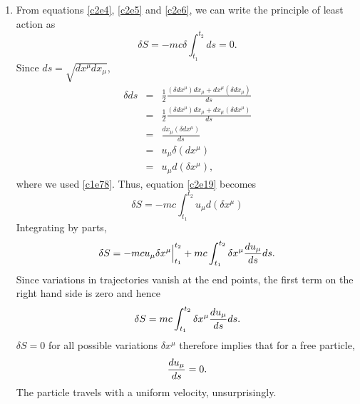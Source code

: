 \begin{enumerate}
\item From equations \eqref{c2e4}, \eqref{c2e5} and \eqref{c2e6}, we can write
the principle of least action as
\begin{equation}\label{c2e19}
\delta S = -mc\delta\int_{t_1}^{t_2} ds = 0.
\end{equation}
Since $ds = \sqrt{dx^\mu dx_\mu}$, 
\begin{eqnarray*}
\delta ds 
 &=& \frac{1}{2}\frac{(\delta dx^\mu)dx_\mu + dx^\mu (\delta dx_\mu)}{ds} \\
 &=& \frac{1}{2}\frac{(\delta dx^\mu)dx_\mu + dx_\mu (\delta dx^\mu)}{ds} \\
 &=& \frac{dx_\mu(\delta dx^\mu)}{ds} \\
 &=& u_\mu \delta(dx^\mu) \\
 &=& u_\mu d(\delta x^\mu),
\end{eqnarray*}
where we used \eqref{c1e78}. Thus, equation \eqref{c2e19} becomes
\begin{equation}\label{c2e20}
\delta S = -mc\int_{t_1}^{t_2}u_\mu d(\delta x^\mu)
\end{equation}
Integrating by parts,
\begin{equation}\label{c2e21}
\delta S = -mc u_\mu \delta x^\mu\Big|_{t_1}^{t_2} + 
mc\int_{t_1}^{t_2}\delta x^\mu \frac{d{u_\mu}}{d{s}}ds.
\end{equation}
Since variations in trajectories vanish at the end points, the first term on the
right hand side is zero and hence
\begin{equation}\label{c2e22}
\delta S = mc\int_{t_1}^{t_2}\delta x^\mu \frac{d{u_\mu}}{d{s}}ds.
\end{equation}
$\delta S = 0$ for all possible variations $\delta x^\mu$ therefore implies 
that for a free particle,
\begin{equation}\label{c2e23}
\frac{d{u_\mu}}{d{s}} = 0.
\end{equation}
The particle travels with a uniform velocity, unsurprisingly.


\end{enumerate}
